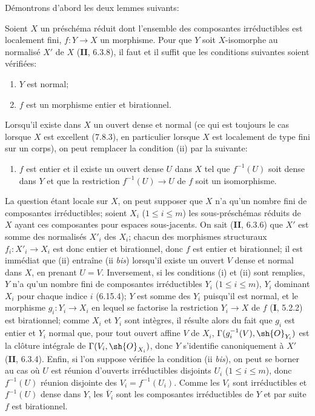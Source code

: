 Démontrons d'abord les deux lemmes suivants:

\begin{lemma}[17.15.14.1]
\label{IV.17.15.14.1}
Soient $X$ un préschéma réduit dont l'ensemble des composantes irréductibles est localement fini, $f:Y\to X$ un morphisme. Pour que $Y$ soit $X$-isomorphe au normalisé $X'$ de $X$ \textup{(\textbf{II}, 6.3.8)}, il faut et il suffit que les conditions suivantes soient vérifiées:
\begin{enumerate}
  \item[\textup{(i)}] $Y$ est normal;
  \item[\textup{(ii)}] $f$ est un morphisme entier et birationnel.
\end{enumerate}

Lorsqu'il existe dans $X$ un ouvert dense et normal (ce qui est toujours le cas lorsque $X$ est excellent \textup{(7.8.3)}, en particulier lorsque $X$ est localement de type fini sur un corps), on peut remplacer la condition \textup{(ii)} par la suivante:
\begin{enumerate}
  \item[\textup{(ii \emph{bis})}] $f$ est entier et il existe un ouvert dense $U$ dans $X$ tel que $f^{-1}(U)$ soit dense dans $Y$ et que la restriction $f^{-1}(U)\to U$ de $f$ soit un isomorphisme.
\end{enumerate}
\end{lemma}

La question étant locale sur $X$, on peut supposer que $X$ n'a qu'un nombre fini de composantes irréductibles; soient $X_i$ ($1\leq i\leq m$) les sous-préschémas réduits de $X$ ayant ces composantes pour espaces sous-jacents. On sait (\textbf{II}, 6.3.6) que $X'$ est somme des normalisés $X'_i$ des $X_i$; chacun des morphismes structuraux $f_i:X'_i\to X_i$ est donc entier et birationnel, donc $f$ est entier et birationnel; il est immédiat que (ii) entraîne (ii \emph{bis}) lorsqu'il existe un ouvert $V$ dense et normal dans $X$, en prenant $U=V$. Inversement, si les conditions (i) et (ii) sont remplies, $Y$ n'a qu'un nombre fini de composantes irréductibles $Y_i$ ($1\leq i\leq m$), $Y_i$ dominant $X_i$ pour chaque indice $i$ (6.15.4); $Y$ est somme des $Y_i$ puisqu'il est normal, et le morphisme $g_i:Y_i\to X_i$ en lequel se factorise la restriction $Y_i\to X$ de $f$ (\textbf{I}, 5.2.2) est birationnel; comme $X_i$ et $Y_i$ sont intègres, il résulte alors du fait que $g_i$ est entier et $Y_i$ normal que, pour tout ouvert affine $V$ de $X_i$, $\Gamma(g_i^{-1}(V),\sh{O}_{Y_i})$ est la clôture intégrale de $\Gamma(V_i,\sh{O}_{X_i})$, donc $Y$ s'identifie canoniquement à $X'$ (\textbf{II}, 6.3.4). Enfin, si l'on suppose vérifiée la condition (ii \emph{bis}), on peut se borner au cas où $U$ est réunion d'ouverts irréductibles disjoints $U_i$ ($1\leq i\leq m$), donc $f^{-1}(U)$ réunion disjointe des $V_i=f^{-1}(U_i)$. Comme les $V_i$ sont irréductibles et $f^{-1}(U)$ dense dans $Y$, les $\overline{V}_i$ sont les composantes irréductibles de $Y$ et par suite $f$ est birationnel.

